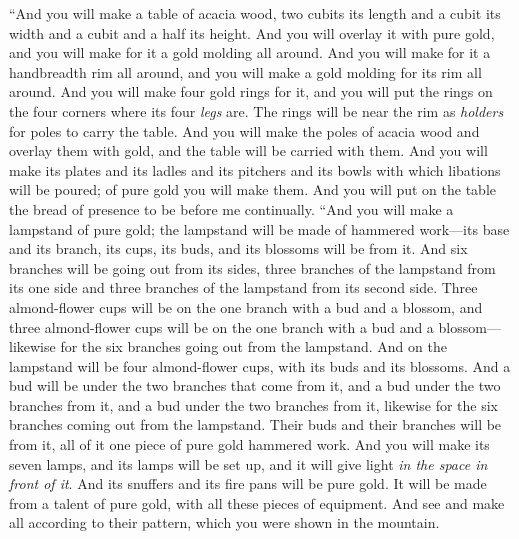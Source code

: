 \begin{biblechapter}
 “And you will make a table of acacia wood, two cubits its length and a cubit its width and a cubit and a half its height.
\verse And you will overlay it with pure gold, and you will make for it a gold molding all around.
\verse And you will make for it a handbreadth rim all around, and you will make a gold molding for its rim all around.
\verse And you will make four gold rings for it, and you will put the rings on the four corners where its four \textit{legs} are.
\verse The rings will be near the rim as \textit{holders} for poles to carry the table.
\verse And you will make the poles of acacia wood and overlay them with gold, and the table will be carried with them.
\verse And you will make its plates and its ladles and its pitchers and its bowls with which libations will be poured; of pure gold you will make them.
\verse And you will put on the table the bread of presence to be before me continually.
\verse “And you will make a lampstand of pure gold; the lampstand will be made of hammered work—its base and its branch, its cups, its buds, and its blossoms will be from it.
\verse And six branches will be going out from its sides, three branches of the lampstand from its one side and three branches of the lampstand from its second side.
\verse Three almond-flower cups will be on the one branch with a bud and a blossom, and three almond-flower cups will be on the one branch with a bud and a blossom—likewise for the six branches going out from the lampstand.
\verse And on the lampstand will be four almond-flower cups, with its buds and its blossoms.
\verse And a bud will be under the two branches that come from it, and a bud under the two branches from it, and a bud under the two branches from it, likewise for the six branches coming out from the lampstand.
\verse Their buds and their branches will be from it, all of it one piece of pure gold hammered work.
\verse And you will make its seven lamps, and its lamps will be set up, and it will give light \textit{in the space in front of it}.
\verse And its snuffers and its fire pans will be pure gold.
\verse It will be made from a talent of pure gold, with all these pieces of equipment.
\verse And see and make all according to their pattern, which you were shown in the mountain.
\end{biblechapter}

